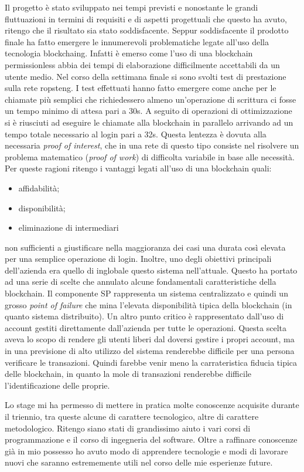 Il progetto è stato sviluppato nei tempi previsti e nonostante le grandi fluttuazioni in termini di requisiti e di aspetti progettuali che questo ha avuto, ritengo che il risultato sia stato soddisfacente. Seppur soddisfacente il prodotto finale ha fatto emergere le innumerevoli problematiche legate all'uso della tecnologia \gls{blockchaing}. Infatti è emerso come l'uso di una blockchain permissionless abbia dei tempi di elaborazione difficilmente accettabili da un utente medio. Nel corso della settimana finale si sono svolti test di prestazione sulla rete \gls{ropsteng}. I test effettuati hanno fatto emergere come anche per le chiamate più semplici che richiedessero almeno un'operazione di scrittura ci fosse un tempo minimo di attesa pari a 30s. A seguito di operazioni di ottimizzazione si è riusciuti ad eseguire le chiamate alla blockchain in parallelo arrivando ad un tempo totale necessario al login pari a 32s. Questa lentezza è dovuta alla necessaria \emph{proof of interest}, che in una rete di questo tipo consiste nel risolvere un problema matematico (\emph{proof of work}) di difficolta variabile in base alle necessità.  
Per queste ragioni ritengo i vantaggi legati all'uso di una blockchain quali:
\begin{itemize}
    \item affidabilità;
    \item disponibilità;
    \item eliminazione di intermediari
\end{itemize} 
non sufficienti a giustificare nella maggioranza dei casi una durata così elevata per una semplice operazione di login.
Inoltre, uno degli obiettivi principali dell'azienda era quello di inglobale questo sistema nell'attuale. Questo ha portato ad una serie di scelte che annulato alcune fondamentali caratteristiche della blockchain. Il componente SP rappresenta un sistema centralizzato e quindi un grosso \emph{point of failure} che mina l'elevata disponibilità tipica della blockchain (in quanto sistema distribuito). Un altro punto critico è rappresentato dall'uso di account gestiti direttamente dall'azienda per tutte le operazioni. Questa scelta aveva lo scopo di rendere gli utenti liberi dal doversi gestire i propri account, ma in una previsione di alto utilizzo del sistema renderebbe difficile per una persona verificare le transazioni. Quindi farebbe venir meno la carrateristica fiducia tipica delle blockchain, in quanto la mole di transazioni renderebbe difficile l'identificazione delle proprie.

Lo stage mi ha permesso di mettere in pratica molte conoscenze acquisite durante il triennio, tra queste alcune di carattere tecnologico, altre di carattere metodologico. Ritengo siano stati di grandissimo aiuto i vari corsi di programmazione e il corso di ingegneria del software. Oltre a raffinare conoscenze già in mio possesso ho avuto modo di apprendere tecnologie e modi di lavorare nuovi che saranno estrememente utili nel corso delle mie esperienze future.

